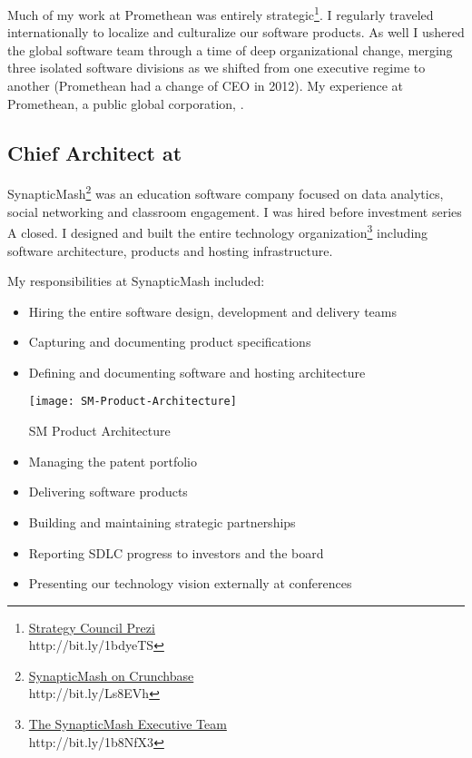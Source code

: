 Much of my work at Promethean was entirely strategic\footnote{\href{http://prezi.com/v-jhcxlibwka/?utm_campaign=share&utm_medium=copy&rc=ex0share}{Strategy Council Prezi}\\ http://bit.ly/1bdyeTS}.  I regularly traveled internationally to localize and culturalize our software products.  As well I ushered the global software team through a time of deep organizational change, merging three isolated software divisions as we shifted from one executive regime to another (Promethean had a change of CEO in 2012).  My experience at Promethean, a public global corporation, .

\subsection{\textbf{Chief Architect} at  \shyears{[2008-2010]}}
SynapticMash\footnote{\href{http://www.crunchbase.com/company/synapticmash}{SynapticMash on Crunchbase}\\ http://bit.ly/Ls8EVh} was an education software company focused on data analytics, social networking and classroom engagement.  I was hired before investment series A closed.  I designed and built the entire technology organization\footnote{\href{http://synapticmash.com/index.php/about}{The SynapticMash Executive Team}\\ http://bit.ly/1b8NfX3} including software architecture, products and hosting infrastructure.

\pagebreak
My responsibilities at SynapticMash included:
\begin{itemize}
\itemsep-0.5em
\item{Hiring the entire software design, development and delivery teams}
\item{Capturing and documenting product specifications}
\item{Defining and documenting software and hosting architecture}
\begin{marginfigure}%
  \texttt{[image: SM-Product-Architecture]}
  \caption{SM Product Architecture}
  \label{fig:SM-Product-Architecture}
\end{marginfigure}
\item{Managing the patent portfolio}
\item{Delivering software products}
\item{Building and maintaining strategic partnerships}
\item{Reporting SDLC progress to investors and the board}
\item{Presenting our technology vision externally at conferences}
\end{itemize}

